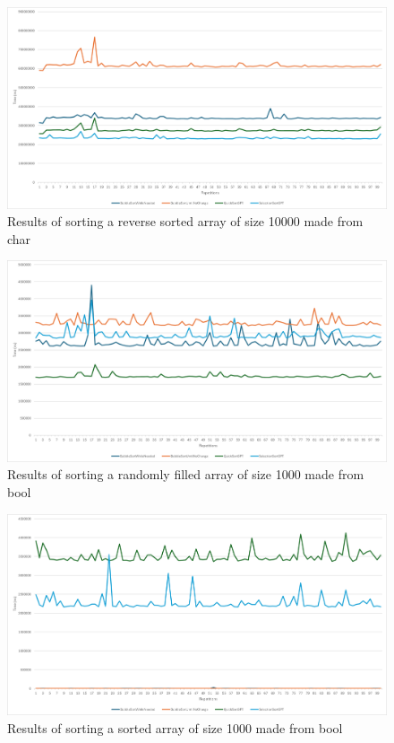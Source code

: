 \documentclass{article}
\begin{document}
    \begin{figure}[!h]
        \centering
        \includegraphics[width=0.7\linewidth]{char_10000_reverse_sorted.png}
        \caption{Results of sorting a reverse sorted array of size 10000 made from char}
        \label{fig:char_10000_reverse_sorted}
    \end{figure}


     \begin{figure}[!h]
        \centering
        \includegraphics[width=0.7\linewidth]{bool_1000_random.png}
        \caption{Results of sorting a randomly filled array of size 1000 made from bool}
        \label{fig:bool_1000_random}
    \end{figure}
    
    \begin{figure}[!h]
        \centering
        \includegraphics[width=0.7\linewidth]{bool_1000_sorted.png}
        \caption{Results of sorting a sorted array of size 1000 made from bool}
        \label{fig:bool_1000_sorted}
    \end{figure}
    
\end{document}
